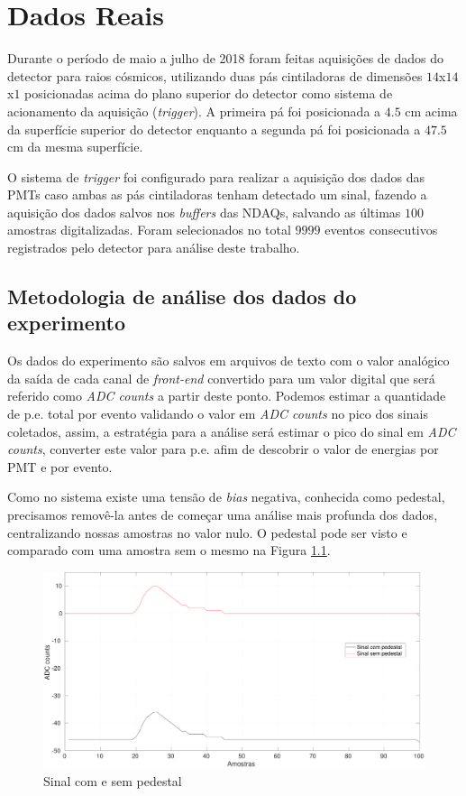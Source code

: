 \chapter{Dados Reais} \label{cap:dadosreais}
\vspace{-2cm}

Durante o período de maio a julho de 2018 foram feitas aquisições de dados do detector para raios cósmicos, utilizando duas pás cintiladoras de dimensões $14$x$14$x$1$ posicionadas acima do plano superior do detector como sistema de acionamento da aquisição (\emph{trigger}). A primeira pá foi posicionada a $4.5$ cm acima da superfície superior do detector enquanto a segunda pá foi posicionada a $47.5$ cm da mesma superfície.

O sistema de \emph{trigger} foi configurado para realizar a aquisição dos dados das PMTs caso ambas as pás cintiladoras tenham detectado um sinal, fazendo a aquisição dos dados salvos nos \emph{buffers} das NDAQs, salvando as últimas $100$ amostras digitalizadas. Foram selecionados no total $9999$ eventos consecutivos registrados pelo detector para análise deste trabalho.



\section{Metodologia de análise dos dados do experimento}

Os dados do experimento são salvos em arquivos de texto com o valor analógico da saída de cada canal de \emph{front-end} convertido para um valor digital que será referido como \emph{ADC counts} a partir deste ponto. Podemos estimar a quantidade de p.e. total por evento validando o valor em \emph{ADC counts} no pico dos sinais coletados, assim, a estratégia para a análise será estimar o pico do sinal em \emph{ADC counts}, converter este valor para p.e. afim de descobrir o valor de energias por PMT e por evento.

Como no sistema existe uma tensão de \emph{bias} negativa, conhecida como pedestal, precisamos removê-la antes de começar uma análise mais profunda dos dados, centralizando nossas amostras no valor nulo. O pedestal pode ser visto e comparado com uma amostra sem o mesmo na Figura \ref{fig:pedestal}.

\begin{figure}[h!]
	\centering
	\includegraphics[width=12cm]{textuais/dadosreais/figuras/pedestal.pdf}
	\caption{Sinal com e sem pedestal}
	\label{fig:pedestal}
\end{figure}

